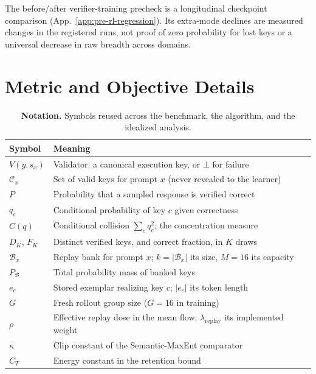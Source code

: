 \documentclass{article}
\newcommand{\1}{\mathbf 1}
\theoremstyle{remark}
\theoremstyle{definition}
\theoremstyle{plain}
\begin{document}
The before/after verifier-training precheck is a longitudinal checkpoint
comparison (App.~\ref{app:pre-rl-regression}). Its extra-mode declines
are measured changes in the registered runs, not proof of zero probability
for lost keys or a universal decrease in raw breadth across domains.

\section{Metric and Objective Details}
\label{app:metric-details}

\begin{table}[H]
\centering
\caption{\textbf{Notation.} Symbols reused across the benchmark, the
algorithm, and the idealized analysis.}
\label{tab:notation}
\small
\setlength{\tabcolsep}{5pt}
\begin{tabularx}{\linewidth}{@{}lX@{}}
\toprule
\textbf{Symbol} & \textbf{Meaning} \\
\midrule
$V(y,s_x)$ & Validator: a canonical execution key, or $\bot$ for failure \\
$\mathcal C_x$ & Set of valid keys for prompt $x$ (never revealed to the learner) \\
$P$ & Probability that a sampled response is verified correct \\
$q_c$ & Conditional probability of key $c$ given correctness \\
$C(q)$ & Conditional collision $\sum_c q_c^2$; the concentration measure \\
$D_K$, $F_K$ & Distinct verified keys, and correct fraction, in $K$ draws \\
$\mathcal B_x$ & Replay bank for prompt $x$; $k=|\mathcal B_x|$ its size, $M=16$ its capacity \\
$P_{\mathcal B}$ & Total probability mass of banked keys \\
$e_c$ & Stored exemplar realizing key $c$; $|e_c|$ its token length \\
$G$ & Fresh rollout group size ($G=16$ in training) \\
$\rho$ & Effective replay dose in the mean flow; $\lambda_{\mathrm{replay}}$ its implemented weight \\
$\kappa$ & Clip constant of the Semantic-MaxEnt comparator \\
$C_T$ & Energy constant in the retention bound \\
\bottomrule
\end{tabularx}
\end{table}
\end{document}
